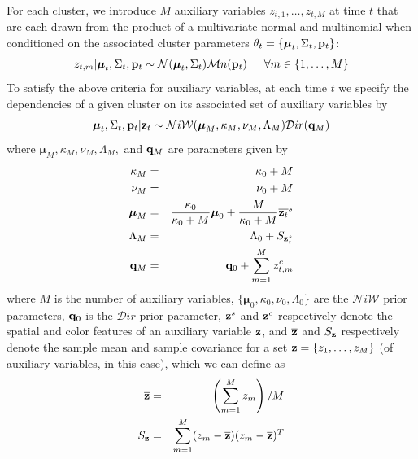 \documentclass[twocolumn, final]{svjour3}
\begin{document}
For each cluster, we introduce $M$ auxiliary variables $z_{t, 1}, \ldots, z_{t, M}$ at time $t$ that are each drawn from the product of a multivariate normal and multinomial when conditioned on the associated cluster parameters $\theta_{t} = \{ \boldsymbol{\mu}_{t}, \Sigma_{t}, \bold{p}_{t} \}$:
\begin{equation}
\label{transker1}
z_{t, m} | \boldsymbol{\mu}_{t}, \Sigma_{t}, \bold{p}_{t}  \sim  \mathcal{N}(\boldsymbol{\mu}_{t}, \Sigma_{t}) \mathcal{M}n(\bold{p}_{t})   \hspace{15pt}   
\forall m \in \{ 1, \ldots, M \}
\end{equation}
To satisfy the above criteria for auxiliary variables, at each time $t$ we specify the dependencies of a given cluster on its associated set of auxiliary variables by
\begin{equation}
\label{transker2}
\boldsymbol{\mu}_{t}, \Sigma_{t}, \bold{p}_{t} | \bold{z}_t  \sim  \mathcal{N}i\mathcal{W}(\boldsymbol{\mu}_{M}, \kappa_{M}, \nu_{M}, \Lambda_{M})  \mathcal{D}ir(\bold{q}_{M})
\end{equation}
where $\boldsymbol{\mu}_{M}, \kappa_{M}, \nu_{M}, \Lambda_{M},$ and $\bold{q}_{M}$ are parameters given by
\begin{eqnarray}
\kappa_{M} &=& \kappa_{0} + M \\
\nu_{M} &=& \nu_{0} + M \\
\boldsymbol{\mu}_{M} &=& \frac{\kappa_{0}}{\kappa_{0}+M} \boldsymbol{\mu}_{0}  +  \frac{M}{\kappa_{0}+M} \overline{\bold{z}_t}^{s}\\
\Lambda_{M} &=& \Lambda_{0} + S_{\bold{z}_{t}^{s}}\\
\bold{q}_{M} &=& \bold{q}_{0} + \sum_{m=1}^{M} z_{t,m}^{c}
\end{eqnarray}
where $M$ is the number of auxiliary variables, $\{ \boldsymbol{\mu}_{0}, \kappa_{0}, \nu_{0}, \Lambda_{0} \}$ are the $\mathcal{N}i\mathcal{W}$ prior parameters, $\bold{q}_{0}$ is the $\mathcal{D}ir$ prior parameter, $\bold{z}^{s}$ and $\bold{z}^{c}$ respectively denote the spatial and color features of an auxiliary variable $\bold{z}$, and $\overline{\bold{z}}$ and $S_{\bold{z}}$ respectively denote the sample mean and sample covariance for a set $\bold{z} = \{ z_{1}, \ldots, z_{M} \}$ (of auxiliary variables, in this case), which we can define as
\begin{eqnarray}
\label{samplemean}
\overline{\bold{z}}  &=&  \left( \sum_{m=1}^{M} z_{m} \right) / M\\
\label{samplecov}
S_{\bold{z}}  &=&  \sum_{m=1}^{M} (z_{m} - \overline{\bold{z}}) (z_{m} - \overline{\bold{z}})^{T}
\end{eqnarray}
\end{document}
